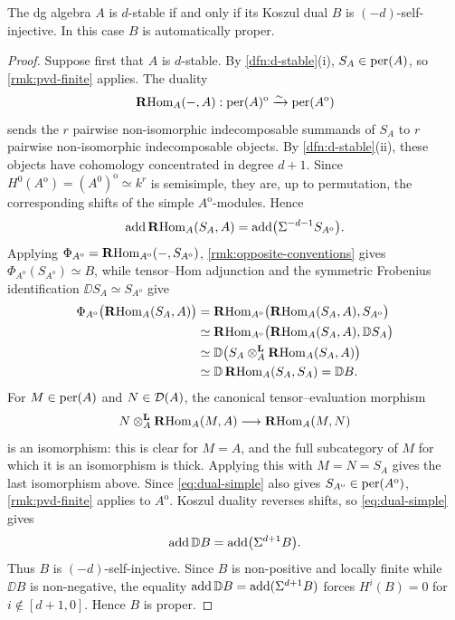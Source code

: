 \documentclass[11pt,a4paper,dvipsnames,x11names]{amsart}
\begin{document}
\begin{prop}\label{prop:d-stable-selfinjective}
The dg algebra $A$ is $d$-stable if and only if its Koszul dual $B$ is $(-d)$-self-injective. In this case $B$ is automatically proper.
\end{prop}
\begin{proof}
Suppose first that $A$ is $d$-stable. By \cref{dfn:d-stable}(i), $S_A\in\operatorname{per}(A)$, so \cref{rmk:pvd-finite} applies. The duality
\[
\operatorname{\mathbf{R}Hom}_A(-,A):\operatorname{per}(A)^{\mathrm{o}}\xrightarrow{\sim}\operatorname{per}(A^{\mathrm{o}})
\]
sends the $r$ pairwise non-isomorphic indecomposable summands of $S_A$ to $r$ pairwise non-isomorphic indecomposable objects. By \cref{dfn:d-stable}(ii), these objects have cohomology concentrated in degree $d+1$. Since $H^0(A^{\mathrm{o}})=(A^0)^{\mathrm{o}}\simeq k^r$ is semisimple, they are, up to permutation, the corresponding shifts of the simple $A^{\mathrm{o}}$-modules. Hence
\begin{equation}\label{eq:dual-simple}
\operatorname{add}\operatorname{\mathbf{R}Hom}_A(S_A,A)=\operatorname{add}\bigl(\Sigma^{-d-1}S_{A^{\mathrm{o}}}\bigr).
\end{equation}
Applying $\Phi_{A^{\mathrm{o}}}=\operatorname{\mathbf{R}Hom}_{A^{\mathrm{o}}}(-,S_{A^{\mathrm{o}}})$, \cref{rmk:opposite-conventions} gives $\Phi_{A^{\mathrm{o}}}(S_{A^{\mathrm{o}}})\simeq B$, while tensor--Hom adjunction and the symmetric Frobenius identification $\DD S_A\simeq S_{A^{\mathrm{o}}}$ give
\[
\begin{aligned}
\Phi_{A^{\mathrm{o}}}\bigl(\operatorname{\mathbf{R}Hom}_A(S_A,A)\bigr)
&=\operatorname{\mathbf{R}Hom}_{A^{\mathrm{o}}}\bigl(\operatorname{\mathbf{R}Hom}_A(S_A,A),S_{A^{\mathrm{o}}}\bigr)\\
&\simeq\operatorname{\mathbf{R}Hom}_{A^{\mathrm{o}}}\bigl(\operatorname{\mathbf{R}Hom}_A(S_A,A),\mathbb D S_A\bigr)\\
&\simeq\mathbb D\bigl(S_A\otimes_A^{\mathbf L}\operatorname{\mathbf{R}Hom}_A(S_A,A)\bigr)\\
&\simeq\mathbb D\operatorname{\mathbf{R}Hom}_A(S_A,S_A)=\mathbb D B.
\end{aligned}
\]
For $M\in\operatorname{per}(A)$ and $N\in\mathcal D(A)$, the canonical tensor--evaluation morphism
\[
N\otimes_A^{\mathbf L}\operatorname{\mathbf{R}Hom}_A(M,A)\longrightarrow\operatorname{\mathbf{R}Hom}_A(M,N)
\]
is an isomorphism: this is clear for $M=A$, and the full subcategory of $M$ for which it is an isomorphism is thick. Applying this with $M=N=S_A$ gives the last isomorphism above.
Since \eqref{eq:dual-simple} also gives $S_{A^{\mathrm{o}}}\in\operatorname{per}(A^{\mathrm{o}})$, \cref{rmk:pvd-finite} applies to $A^{\mathrm{o}}$. Koszul duality reverses shifts, so \eqref{eq:dual-simple} gives
\[
\operatorname{add}\mathbb D B=\operatorname{add}\bigl(\Sigma^{d+1}B\bigr).
\]
Thus $B$ is $(-d)$-self-injective. Since $B$ is non-positive and locally finite while $\DD B$ is non-negative, the equality $\operatorname{add}\mathbb D B=\operatorname{add}(\Sigma^{d+1}B)$ forces $H^i(B)=0$ for $i\notin[d+1,0]$. Hence $B$ is proper.


\end{proof}
\end{document}
